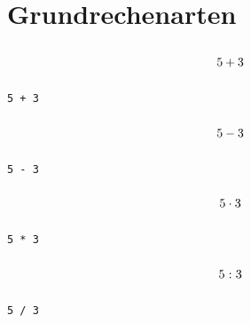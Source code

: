 \documentclass
[
  fontsize = 11pt,
  parskip  = half-,
  BCOR     = 0pt,
  DIV      = 11,
  ngerman
]
{scrartcl}
\begin{document}

\newlength{\mw}%
\setlength{\mw}{0.40\textwidth}%
\newlength{\cw}%
\setlength{\cw}{0.59\textwidth}%

\section{Grundrechenarten}
\begin{minipage}{\mw}
  \begin{equation*}
    \vphantom{\bigg(}%
    5+3
  \end{equation*}
\end{minipage}%
\hfill
\begin{minipage}{\cw}
\begin{verbatim}
5 + 3
\end{verbatim}
\end{minipage}
\begin{minipage}{\mw}
  \begin{equation*}
    \vphantom{\bigg(}%
    5-3
  \end{equation*}
\end{minipage}%
\hfill
\begin{minipage}{\cw}
\begin{verbatim}
5 - 3
\end{verbatim}
\end{minipage}
\begin{minipage}{\mw}
  \begin{equation*}
    \vphantom{\bigg(}%
    5\cdot3
  \end{equation*}
\end{minipage}%
\hfill
\begin{minipage}{\cw}
\begin{verbatim}
5 * 3
\end{verbatim}
\end{minipage}
\begin{minipage}{\mw}
  \begin{equation*}
    \vphantom{\bigg(}%
    5:3
  \end{equation*}
\end{minipage}%
\hfill
\begin{minipage}{\cw}
\begin{verbatim}
5 / 3
\end{verbatim}
\end{minipage}
\end{document}
